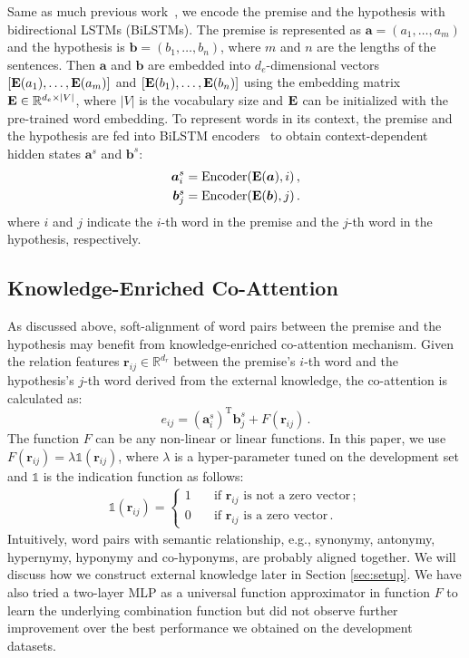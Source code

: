 \documentclass[11pt,a4paper]{article}
\newcommand{\vect}[1]{\bm{#1}}
\newcommand{\mat}[1]{\bf{#1}}
\newcommand{\RR}{\mathbb{R}}
\begin{document}
Same as much previous work~\citep{DBLP:conf/acl/ChenZLWJI17,DBLP:conf/repeval/ChenZLWJI17}, we encode the premise and the hypothesis with bidirectional LSTMs (BiLSTMs). The premise is represented as  $\vect{a} = (a_1,\dots,a_m)$ and the hypothesis is $\vect{b}=(b_1,\dots,b_{n})$, where $m$ and $n$ are the lengths of the sentences. Then $\vect{a}$ and $\vect{b}$ are embedded into $d_e$-dimensional vectors $[{\mat E}(a_1),\dots,{\mat E}(a_m)]$ and $[{\mat E}(b_1),\dots,{\mat E}(b_n)]$ using the embedding matrix ${\mat E} \in \RR^{d_e \times |V|}$, where $|V|$ is the vocabulary size and ${\mat E}$ can be initialized with the pre-trained word embedding. To represent words in its context, the premise and the hypothesis are fed into BiLSTM encoders~\citep{DBLP:journals/neco/HochreiterS97} to obtain context-dependent hidden states ${\vect a}^s$ and ${\vect b}^s$: 
\begin{align}
{\vect a}^s_i &=\mathrm{Encoder}({\mat E}(\vect{a}),i) \,,\\
{\vect b}^s_j &=\mathrm{Encoder}({\mat E}(\vect{b}),j) \,.
\end{align}
where $i$ and $j$ indicate the $i$-th word in the premise and the $j$-th word in the hypothesis, respectively.

\subsection{Knowledge-Enriched Co-Attention}
As discussed above, soft-alignment of word pairs between the premise and the hypothesis may benefit from knowledge-enriched co-attention mechanism. Given the relation features ${\vect r}_{ij} \in \RR^{d_r}$ between the premise's $i$-th word and the hypothesis's $j$-th word derived from the external knowledge, the co-attention is calculated as:
\begin{equation}
e_{ij} = ({\vect a}^s_i)^\mathrm{T} {\vect b}^s_j + F({\vect r}_{ij}) \,.
\label{eq:eij}
\end{equation}
The function $F$ can be any non-linear or linear functions. In this paper, we use $F({\vect r}_{ij}) = \lambda \mathds{1}({\vect r}_{ij})$, where $\lambda$ is a hyper-parameter tuned on the development set and $\mathds{1}$ is the indication function as follows:
\begin{align}
\mathds{1}({\vect r}_{ij}) =
  \begin{cases}
    1  & \quad \text{if } {\vect r}_{ij} \text{ is not a zero vector} \,;\\
    0  & \quad \text{if } {\vect r}_{ij} \text{ is a zero vector} \,.
  \end{cases}
\end{align}
Intuitively, word pairs with semantic relationship, e.g., synonymy, antonymy, hypernymy, hyponymy and co-hyponyms, are probably aligned together. We will discuss how we construct external knowledge later in Section \ref{sec:setup}. We have also tried a two-layer MLP as a universal function approximator in function $F$ to learn the underlying combination function but did not observe further improvement over the best performance we obtained on the development datasets. 
\end{document}
